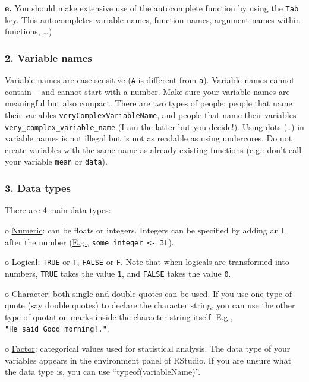 \documentclass[
]{article}
\begin{document}
\textbf{e.} You should make extensive use of the autocomplete function
by using the \texttt{Tab} key. This autocompletes variable names,
function names, argument names within functions, \ldots)

\hypertarget{variable-names}{%
\subsubsection{2. Variable names}\label{variable-names}}

Variable names are case sensitive (\texttt{A} is different from
\texttt{a}). Variable names cannot contain \texttt{-} and cannot start
with a number. Make sure your variable names are meaningful but also
compact. There are two types of people: people that name their variables
\texttt{veryComplexVariableName}, and people that name their variables
\texttt{very\_complex\_variable\_name} (I am the latter but you
decide!). Using dots (\texttt{.}) in variable names is not illegal but
is not as readable as using undercores. Do not create variables with the
same name as already existing functions (e.g.: don't call your variable
\texttt{mean} or \texttt{data}).

\hypertarget{data-types}{%
\subsubsection{3. Data types}\label{data-types}}

There are 4 main data types:

o \underline{Numeric}: can be floats or integers. Integers can be
specified by adding an \texttt{L} after the number (\underline{E.g.},
\texttt{some\_integer\ \textless{}-\ 3L}).

o \underline{Logical}: \texttt{TRUE} or \texttt{T}, \texttt{FALSE} or
\texttt{F}. Note that when logicals are transformed into numbers,
\texttt{TRUE} takes the value \texttt{1}, and \texttt{FALSE} takes the
value \texttt{0}.

o \underline{Character}: both single and double quotes can be used. If
you use one type of quote (say double quotes) to declare the character
string, you can use the other type of quotation marks inside the
character string itself. \underline{E.g.},
\texttt{"He\ said\ \textquotesingle{}Good\ morning!\textquotesingle{}."}.

o \underline{Factor}: categorical values used for statistical analysis.
The data type of your variables appears in the environment panel of
RStudio. If you are unsure what the data type is, you can use
``typeof(variableName)''.
\end{document}
